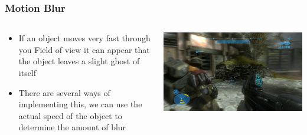 \begin{frame}
	\frametitle{Motion Blur}
\begin{columns}
	\begin{column}{0.5\textwidth}
		\begin{itemize}
			\item If an object moves very fast through you Field of view it can appear that the object leaves a slight ghost of itself
			\item There are several ways of implementing this, we can use the actual speed of the object to determine the amount of blur
		\end{itemize}
	\end{column}
	\begin{column}{0.5\textwidth} 
		\begin{center}
			\includegraphics[width=\textwidth]{motion_blur}
		\end{center}
	\end{column}
\end{columns}
\end{frame}

